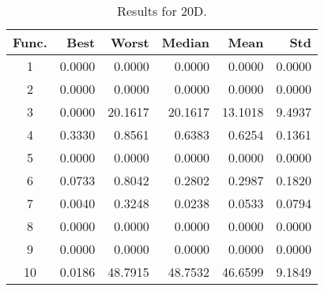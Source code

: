 \begin{table}[ht]
\centering
\caption{ Results for 20D. }
\label{tab:20D}
\begin{tabular}{crrrrr}
\hline
{Func.} & Best & Worst & Median & Mean & Std \\
\hline
1 & 0.0000 & 0.0000 & 0.0000 & 0.0000 & 0.0000 \\
2 & 0.0000 & 0.0000 & 0.0000 & 0.0000 & 0.0000 \\
3 & 0.0000 & 20.1617 & 20.1617 & 13.1018 & 9.4937 \\
4 & 0.3330 & 0.8561 & 0.6383 & 0.6254 & 0.1361 \\
5 & 0.0000 & 0.0000 & 0.0000 & 0.0000 & 0.0000 \\
6 & 0.0733 & 0.8042 & 0.2802 & 0.2987 & 0.1820 \\
7 & 0.0040 & 0.3248 & 0.0238 & 0.0533 & 0.0794 \\
8 & 0.0000 & 0.0000 & 0.0000 & 0.0000 & 0.0000 \\
9 & 0.0000 & 0.0000 & 0.0000 & 0.0000 & 0.0000 \\
10 & 0.0186 & 48.7915 & 48.7532 & 46.6599 & 9.1849 \\
\hline
\end{tabular}
\end{table}
